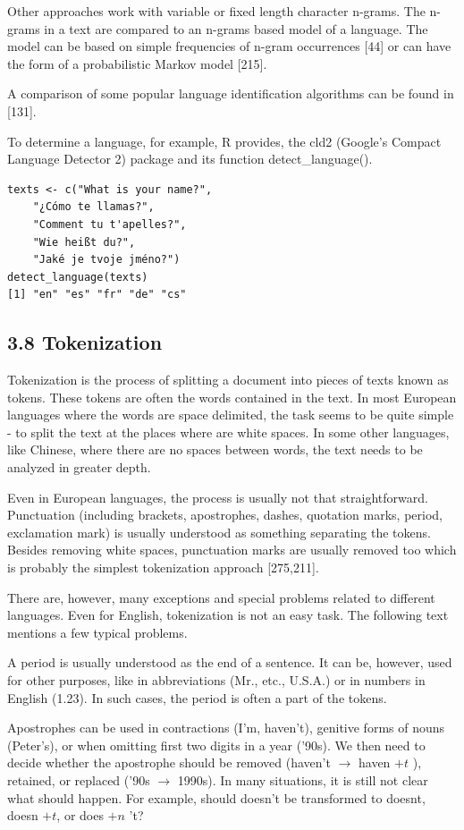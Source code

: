 \documentclass[10pt]{book}
\begin{document}
Other approaches work with variable or fixed length character n-grams. The n-grams in a text are compared to an n-grams based model of a language. The model can be based on simple frequencies of n-gram occurrences [44] or can have the form of a probabilistic Markov model [215].

A comparison of some popular language identification algorithms can be found in [131].

To determine a language, for example, R provides, the cld2 (Google's Compact Language Detector 2) package and its function detect\_language().

\begin{verbatim}
texts <- c("What is your name?",
    "¿Cómo te llamas?",
    "Comment tu t'apelles?",
    "Wie heißt du?",
    "Jaké je tvoje jméno?")
detect_language(texts)
[1] "en" "es" "fr" "de" "cs"
\end{verbatim}

\subsection*{3.8 Tokenization}
Tokenization is the process of splitting a document into pieces of texts known as tokens. These tokens are often the words contained in the text. In most European languages where the words are space delimited, the task seems to be quite simple - to split the text at the places where are white spaces. In some other languages, like Chinese, where there are no spaces between words, the text needs to be analyzed in greater depth.

Even in European languages, the process is usually not that straightforward. Punctuation (including brackets, apostrophes, dashes, quotation marks, period, exclamation mark) is usually understood as something separating the tokens. Besides removing white spaces, punctuation marks are usually removed too which is probably the simplest tokenization approach [275,211].

There are, however, many exceptions and special problems related to different languages. Even for English, tokenization is not an easy task. The following text mentions a few typical problems.

A period is usually understood as the end of a sentence. It can be, however, used for other purposes, like in abbreviations (Mr., etc., U.S.A.) or in numbers in English (1.23). In such cases, the period is often a part of the tokens.

Apostrophes can be used in contractions (I'm, haven't), genitive forms of nouns (Peter's), or when omitting first two digits in a year ('90s). We then need to decide whether the apostrophe should be removed (haven't $\rightarrow$ haven $+t$ ), retained, or replaced ('90s $\rightarrow$ 1990s). In many situations, it is still not clear what should happen. For example, should doesn't be transformed to doesnt, doesn $+t$, or does $+n$ 't?
\end{document}
